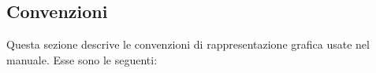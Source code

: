 %
%
\newcommand{\nix}[1]{\texttt{[image: nix.eps]} #1}
\newcommand{\win}[1]{\texttt{[image: win.eps]} #1}
\newcommand{\osx}[1]{\texttt{[image: osx.eps]} #1}
%
\newcommand{\nixcaption}{\protect\texttt{[image: nix.eps]}}
\newcommand{\wincaption}{\protect\texttt{[image: win.eps]}}
\newcommand{\osxcaption}{\protect\texttt{[image: osx.eps]}}


\newcommand{\qtmainmenuopt}[1]{\textsf{#1}}
\newcommand{\qtdropmenuopt}[1]{\textsf{#1}}
\newcommand{\qtdialog}[1]{\textsf{#1}}

 

%
\subsection{Convenzioni}\label{label_conventions}

Questa sezione descrive le convenzioni di rappresentazione grafica
usate nel manuale. Esse sono le seguenti:

